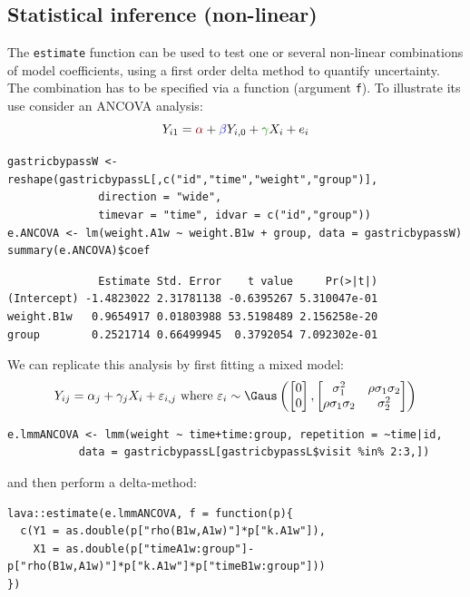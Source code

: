 \documentclass[12pt]{article}
\newcommand{\darkblue}{blue!80!black}
\newcommand{\darkgreen}{green!50!black}
\newcommand{\darkred}{red!50!black}
\begin{document}
\clearpage

\subsection{Statistical inference (non-linear)}
\label{sec:org78b346c}

The \texttt{estimate} function can be used to test one or several non-linear
combinations of model coefficients, using a first order delta method
to quantify uncertainty. The combination has to be specified via a
function (argument \texttt{f}). To illustrate its use consider an ANCOVA
analysis:
\[ Y_{i1} = \textcolor{\darkred}{\alpha} + \textcolor{\darkblue}{\beta} Y_{i,0} + \textcolor{\darkgreen}{\gamma} X_{i} + e_{i} \]

\lstset{language=r,label= ,caption= ,captionpos=b,numbers=none}
\begin{lstlisting}
gastricbypassW <- reshape(gastricbypassL[,c("id","time","weight","group")],
			  direction = "wide",
			  timevar = "time", idvar = c("id","group"))
e.ANCOVA <- lm(weight.A1w ~ weight.B1w + group, data = gastricbypassW)
summary(e.ANCOVA)$coef
\end{lstlisting}

\begin{verbatim}
              Estimate Std. Error    t value     Pr(>|t|)
(Intercept) -1.4823022 2.31781138 -0.6395267 5.310047e-01
weight.B1w   0.9654917 0.01803988 53.5198489 2.156258e-20
group        0.2521714 0.66499945  0.3792054 7.092302e-01
\end{verbatim}


We can replicate this analysis by first fitting a mixed model:
\[ Y_{ij} = \alpha_j + \gamma_j X_{i} + \varepsilon_{i,j} \text{ where } \varepsilon_i \sim \Gaus \left( \begin{bmatrix} 0 \\ 0 \end{bmatrix}, \begin{bmatrix} \sigma^2_1 & \rho \sigma_1 \sigma_2 \\ \rho \sigma_1 \sigma_2 & \sigma^2_2 \end{bmatrix} \right) \]
\lstset{language=r,label= ,caption= ,captionpos=b,numbers=none}
\begin{lstlisting}
e.lmmANCOVA <- lmm(weight ~ time+time:group, repetition = ~time|id,
		   data = gastricbypassL[gastricbypassL$visit %in% 2:3,])
\end{lstlisting}

and then perform a delta-method:
\lstset{language=r,label= ,caption= ,captionpos=b,numbers=none}
\begin{lstlisting}
lava::estimate(e.lmmANCOVA, f = function(p){
  c(Y1 = as.double(p["rho(B1w,A1w)"]*p["k.A1w"]),
    X1 = as.double(p["timeA1w:group"]-p["rho(B1w,A1w)"]*p["k.A1w"]*p["timeB1w:group"]))
})
\end{lstlisting}
\end{document}
